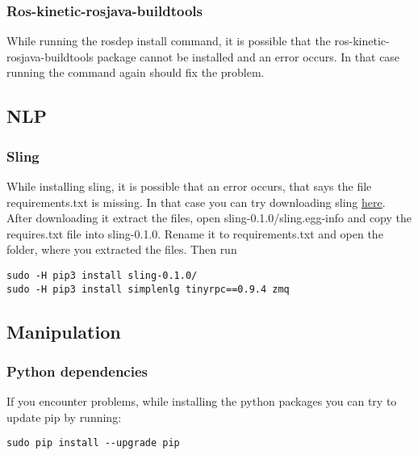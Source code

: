 \documentclass[main.tex]{subfiles}
\begin{document}
	\subsubsection{Ros-kinetic-rosjava-buildtools}
	While running the rosdep install command, it is possible that the ros-kinetic-rosjava-buildtools package cannot be installed and an error occurs. In that case running the command again should fix the problem.


	\subsection{NLP}
	\subsubsection{Sling}
	While installing sling, it is possible that an error occurs, that says the file requirements.txt is missing. In that case you can try downloading sling \href{https://pypi.org/project/sling/#files}{here}. After downloading it extract the files, open sling-0.1.0/sling.egg-info and copy the requires.txt file into sling-0.1.0. Rename it to requirements.txt and open the folder, where you extracted the files. Then run \\
	\begin{lstlisting}
sudo -H pip3 install sling-0.1.0/
sudo -H pip3 install simplenlg tinyrpc==0.9.4 zmq
\end{lstlisting}
	
	\subsection{Manipulation}
	\subsubsection{Python dependencies}
	If you encounter problems, while installing the python packages you can try to update pip by running:\\
	\begin{lstlisting}
sudo pip install --upgrade pip
\end{lstlisting}	
	
\end{document}
